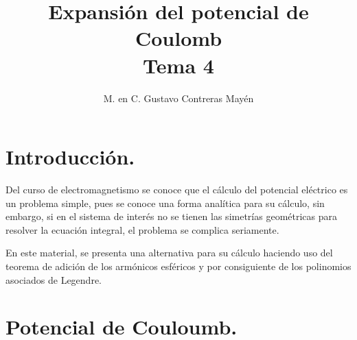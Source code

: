 

\title{Expansión del potencial de Coulomb \\ {\large Tema 4}\vspace{-3ex}}
\author{M. en C. Gustavo Contreras Mayén}
\date{ }

\pagestyle{fancy}
\fancyhf{}
\lhead{\leftmark}
\rfoot{\thepage}
\setlength{\headheight}{16pt}%

\def\changemargin#1#2{\list{}{\rightmargin#2\leftmargin#1}\item[]}
\let\endchangemargin=\endlist 



\maketitle
\fontsize{14}{14}\selectfont
\tableofcontents
\newpage

\section{Introducción.}

Del curso de electromagnetismo se conoce que el cálculo del potencial eléctrico es un problema simple, pues se conoce una forma analítica para su cálculo, sin embargo, si en el sistema de interés no se tienen las simetrías geométricas para resolver la ecuación integral, el problema se complica seriamente.
\par
En este material, se presenta una alternativa para su cálculo haciendo uso del teorema de adición de los armónicos esféricos y por consiguiente de los polinomios asociados de Legendre.

\section{Potencial de Couloumb.}

